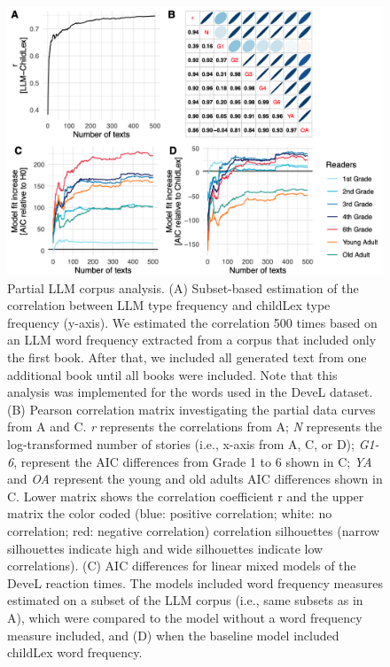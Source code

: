 \documentclass[doc, a4paper]{apa7}
\begin{document}
\begin{figure}[!htbp]
    \centering
    \includegraphics[scale=.30]{figures/partial_fig.png}
    \caption{Partial LLM corpus analysis. (A) Subset-based estimation of the correlation between LLM type frequency and childLex type frequency (y-axis). We estimated the correlation 500 times based on an LLM word frequency extracted from a corpus that included only the first book. After that, we included all generated text from one additional book until all books were included. Note that this analysis was implemented for the words used in the DeveL dataset. (B) Pearson correlation matrix investigating the partial data curves from A and C. \textit{r} represents the correlations from A; \textit{N} represents the log-transformed number of stories (i.e., x-axis from A, C, or D); \textit{G1-6}, represent the AIC differences from Grade 1 to 6 shown in C; \textit{YA} and \textit{OA} represent the young and old adults AIC differences shown in C. Lower matrix shows the correlation coefficient r and the upper matrix the color coded (blue: positive correlation; white: no correlation; red: negative correlation) correlation silhouettes (narrow silhouettes indicate high and wide silhouettes indicate low correlations). (C) AIC differences for linear mixed models of the DeveL reaction times. The models included word frequency measures estimated on a subset of the LLM corpus (i.e., same subsets as in A), which were compared to the model without a word frequency measure included, and (D) when the baseline model included childLex word frequency.}
    \label{fig:partial_data}
\end{figure}
\end{document}
